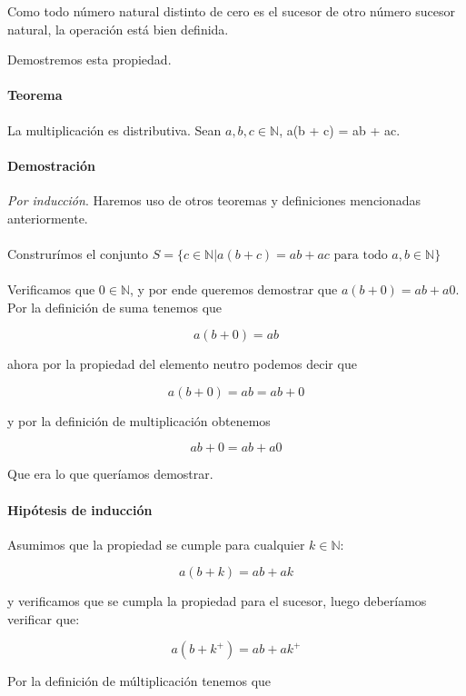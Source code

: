 \documentclass{article}
\begin{document}
Como todo número natural distinto de cero es el sucesor de otro número sucesor natural, la operación está bien definida.

Demostremos esta propiedad.

\paragraph{Teorema} La multiplicación es distributiva. Sean $a,b,c \in \mathbb{N}$, a(b + c) = ab + ac.

\paragraph{Demostración} \textit{Por inducción}. Haremos uso de otros teoremas y definiciones mencionadas anteriormente.

\paragraph{} Construrímos el conjunto $S = \{ c \in \mathbb{N}| a(b+c) = ab + ac \text{ para todo } a,b \in \mathbb{N}\}$

\paragraph{} Verificamos que $0 \in \mathbb{N}$, y por ende queremos demostrar que $a(b + 0) = ab + a0$. Por la definición de suma tenemos que

	$$a(b + 0) = ab$$

ahora por la propiedad del elemento neutro podemos decir que

$$a(b + 0) = ab = ab + 0 $$

y por la definición de multiplicación obtenemos

$$ab + 0 = ab + a0$$

Que era lo que queríamos demostrar.

\paragraph{Hipótesis de inducción} Asumimos que la propiedad se cumple para cualquier $k \in \mathbb{N}$:

$$a(b + k) = ab + ak$$

y verificamos que se cumpla la propiedad para el sucesor, luego deberíamos verificar que:

$$a(b + k^+) = ab + ak^+$$

Por la definición de múltiplicación tenemos que
\end{document}

